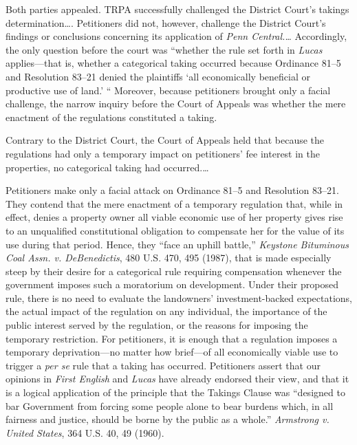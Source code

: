 Both parties appealed. TRPA successfully challenged the District Court's takings
determination\ldots . Petitioners did not, however, challenge the District
Court's findings or conclusions concerning its application of \textit{Penn
Central.\ldots } Accordingly, the only question before the court was ``whether
the rule set forth in \textit{Lucas} applies---that is, whether a categorical
taking occurred because Ordinance 81--5 and Resolution 83--21 denied the
plaintiffs `all economically beneficial or productive use of land.' `` Moreover,
because petitioners brought only a facial challenge, the narrow inquiry before
the Court of Appeals was whether the mere enactment of the regulations
constituted a taking.

Contrary to the District Court, the Court of Appeals held that because the
regulations had only a temporary impact on petitioners' fee interest in the
properties, no categorical taking had occurred.\ldots



Petitioners make only a facial attack on Ordinance 81--5 and Resolution 83--21.
They contend that the mere enactment of a temporary regulation that, while in
effect, denies a property owner all viable economic use of her property gives
rise to an unqualified constitutional obligation to compensate her for the value
of its use during that period. Hence, they ``face an uphill battle,''
\textit{Keystone Bituminous Coal Assn. v. DeBenedictis}, 480 U.S. 470, 495
(1987), that is made especially steep by their desire for a categorical rule
requiring compensation whenever the government imposes such a moratorium on
development. Under their proposed rule, there is no need to evaluate the
landowners' investment-backed expectations, the actual impact of the regulation
on any individual, the importance of the public interest served by the
regulation, or the reasons for imposing the temporary restriction. For
petitioners, it is enough that a regulation imposes a temporary deprivation---no
matter how brief---of all economically viable use to trigger a \textit{per se}
rule that a taking has occurred. Petitioners assert that our opinions in
\textit{First English} and \textit{Lucas} have already endorsed their view, and
that it is a logical application of the principle that the Takings Clause was
``designed to bar Government from forcing some people alone to bear burdens
which, in all fairness and justice, should be borne by the public as a whole.''
\textit{Armstrong v. United States}, 364 U.S. 40, 49 (1960).

